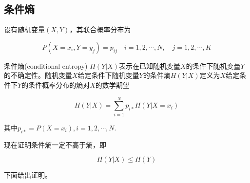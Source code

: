 \subsection{条件熵}

设有随机变量$(X, Y)$，其联合概率分布为

\begin{equation}
    P(X=x_i, Y=y_j) = p_{ij}\quad i=1,2,\cdots,N,\quad j=1,2,\cdots,K
\end{equation}

条件熵(conditional entropy) $H(Y|X)$表示在已知随机变量$X$的条件下随机变量$Y$的不确定性。随机变量$X$给定条件下随机变量$Y$的条件熵$H(Y|X)$定义为$X$给定条件下$Y$的条件概率分布的熵对$X$的数学期望

\begin{equation}
    H(Y|X) = \sum_{i=1}^Np_{i*}H(Y|X=x_i)
\end{equation}

其中$p_{i*} = P(X=x_i),i=1,2,\cdots,N$.

现在证明条件熵一定不高于熵，即

\begin{equation}
    H(Y|X) \leq H(Y)
\end{equation}

下面给出证明。

